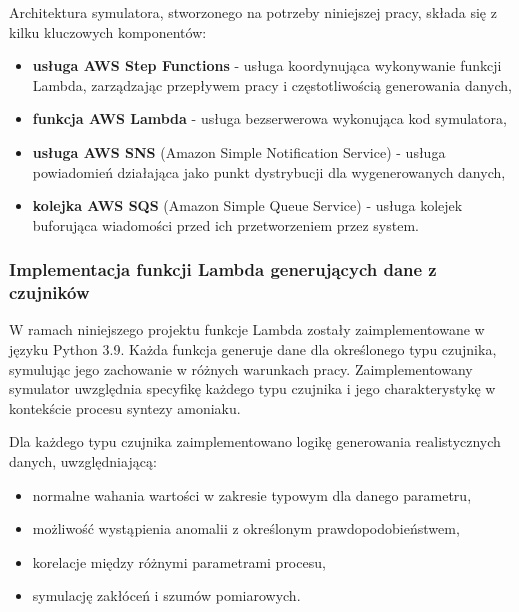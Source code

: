 Architektura symulatora, stworzonego na potrzeby niniejszej pracy, składa się z kilku kluczowych komponentów:

\begin{itemize}
    \item \textbf{usługa AWS Step Functions} - usługa koordynująca wykonywanie funkcji Lambda, zarządzając przepływem pracy i częstotliwością generowania danych,
    \item \textbf{funkcja AWS Lambda} \cite{aws_lambda_docs} - usługa bezserwerowa wykonująca kod symulatora,
    \item \textbf{usługa AWS SNS} (Amazon Simple Notification Service) \cite{sns_docs} - usługa powiadomień działająca jako punkt dystrybucji dla wygenerowanych danych,
    \item \textbf{kolejka AWS SQS} (Amazon Simple Queue Service) \cite{sqs_docs} - usługa kolejek buforująca wiadomości przed ich przetworzeniem przez system.
\end{itemize}

%

\subsubsection{Implementacja funkcji Lambda generujących dane z czujników}
\label{subsubsec:implementacja_lambda}

W ramach niniejszego projektu funkcje Lambda zostały zaimplementowane w języku Python 3.9. Każda funkcja generuje dane dla określonego typu czujnika,
symulując jego zachowanie w różnych warunkach pracy. Zaimplementowany symulator uwzględnia specyfikę każdego typu czujnika i jego charakterystykę w kontekście procesu syntezy amoniaku.

\vspace{0.3em}

Dla każdego typu czujnika zaimplementowano logikę generowania realistycznych danych, uwzględniającą:
\begin{itemize}
    \item normalne wahania wartości w zakresie typowym dla danego parametru,
    \item możliwość wystąpienia anomalii z określonym prawdopodobieństwem,
    \item korelacje między różnymi parametrami procesu,
    \item symulację zakłóceń i szumów pomiarowych.
\end{itemize}